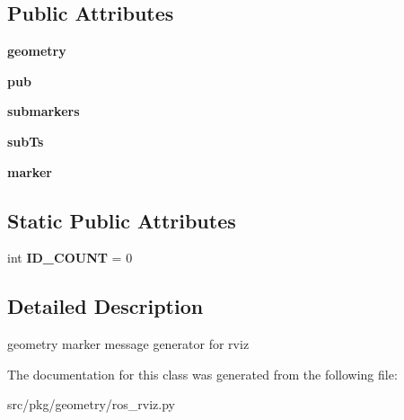 \subsection*{Public Attributes}
\begin{DoxyCompactItemize}
\item 
\mbox{\label{classrnb-planning_1_1src_1_1pkg_1_1geometry_1_1ros__rviz_1_1_geo_marker_af5958ea45242b56764959a9b7303b71e}} 
{\bfseries geometry}
\item 
\mbox{\label{classrnb-planning_1_1src_1_1pkg_1_1geometry_1_1ros__rviz_1_1_geo_marker_a14a1362f80402c829bac253e58ffb5ad}} 
{\bfseries pub}
\item 
\mbox{\label{classrnb-planning_1_1src_1_1pkg_1_1geometry_1_1ros__rviz_1_1_geo_marker_a85a69e30d7b8bb47df5aec0b7ad793e9}} 
{\bfseries submarkers}
\item 
\mbox{\label{classrnb-planning_1_1src_1_1pkg_1_1geometry_1_1ros__rviz_1_1_geo_marker_a7ae9dd10bfaf1b170f514a4a2fab5dd8}} 
{\bfseries sub\+Ts}
\item 
\mbox{\label{classrnb-planning_1_1src_1_1pkg_1_1geometry_1_1ros__rviz_1_1_geo_marker_aeb82e6c31518ebdd2a0f274d385ca9f7}} 
{\bfseries marker}
\end{DoxyCompactItemize}
\subsection*{Static Public Attributes}
\begin{DoxyCompactItemize}
\item 
\mbox{\label{classrnb-planning_1_1src_1_1pkg_1_1geometry_1_1ros__rviz_1_1_geo_marker_aad27464348627680881421eefd7081d2}} 
int {\bfseries I\+D\+\_\+\+C\+O\+U\+NT} = 0
\end{DoxyCompactItemize}


\subsection{Detailed Description}
geometry marker message generator for rviz 

The documentation for this class was generated from the following file\+:\begin{DoxyCompactItemize}
\item 
src/pkg/geometry/ros\+\_\+rviz.\+py\end{DoxyCompactItemize}

